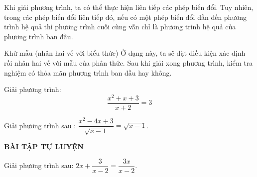 \begin{note}
	Khi giải phương trình, ta có thể thực hiện liên tiếp các phép biến đổi. Tuy nhiên, trong các phép biến đổi liên tiếp đó, nếu có một phép biến đổi dẫn đến phương trình hệ quả thì phương trình cuối cùng vẫn chỉ là phương trình hệ quả của phương trình ban đầu.
\end{note}

\begin{dang}{Khử mẫu (nhân hai vế với biểu thức)}
	Ở dạng này, ta sẽ đặt điều kiện xác định rồi nhân hai vế với mẫu của phân thức. Sau khi giải xong phương trình, kiểm tra nghiệm có thỏa mãn phương trình ban đầu hay không.
\end{dang}
\begin{vd}%
	Giải phương trình: $$\dfrac{x^2 + x + 3}{x+2} = 3  $$
\end{vd}
\begin{vd}%
	Giải phương trình sau : $ \dfrac{x^2-4x+3}{\sqrt{x-1}}=\sqrt{x-1}$.
\end{vd}
\begin{center}
	\textbf{BÀI TẬP TỰ LUYỆN}
\end{center}
\begin{bt}%
	Giải phương trình sau: $2x+\dfrac{3}{x-2}=\dfrac{3x}{x-2}$.
\end{bt}
